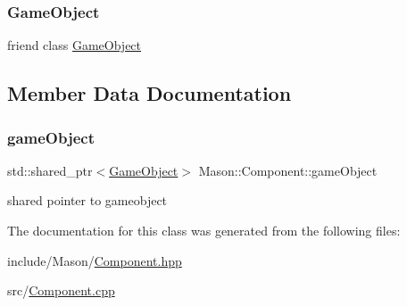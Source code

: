 \subsubsection{\texorpdfstring{Game\+Object}{GameObject}}
{\footnotesize\ttfamily friend class \hyperlink{class_mason_1_1_game_object}{Game\+Object}\hspace{0.3cm}{\ttfamily [friend]}}



\subsection{Member Data Documentation}
\hypertarget{class_mason_1_1_component_abaa67b569d0a70e26a4606f4a099a925}{}\label{class_mason_1_1_component_abaa67b569d0a70e26a4606f4a099a925} 
\subsubsection{\texorpdfstring{game\+Object}{gameObject}}
{\footnotesize\ttfamily std\+::shared\+\_\+ptr$<$\hyperlink{class_mason_1_1_game_object}{Game\+Object}$>$ Mason\+::\+Component\+::game\+Object\hspace{0.3cm}{\ttfamily [protected]}}



shared pointer to gameobject 



The documentation for this class was generated from the following files\+:\begin{DoxyCompactItemize}
\item 
include/\+Mason/\hyperlink{_component_8hpp}{Component.\+hpp}\item 
src/\hyperlink{_component_8cpp}{Component.\+cpp}\end{DoxyCompactItemize}
